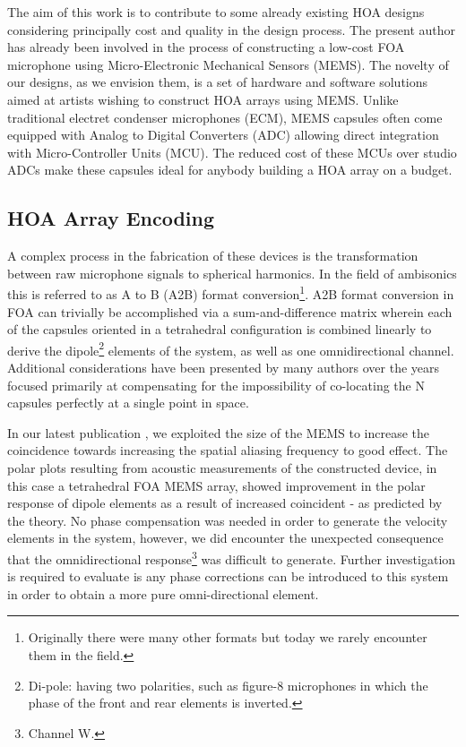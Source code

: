 The aim of this work is to contribute to some already existing HOA designs considering principally cost and quality in the design process. The present author has already been involved in the process of constructing a low-cost FOA microphone using Micro-Electronic Mechanical Sensors (MEMS). The novelty of our designs, as we envision them, is a set of hardware and software solutions aimed at artists wishing to construct HOA arrays using MEMS. Unlike traditional electret condenser microphones (ECM), MEMS capsules often come equipped with Analog to Digital Converters (ADC) allowing direct integration with Micro-Controller Units (MCU). The reduced cost of these MCUs over studio ADCs make these capsules ideal for anybody building a HOA array on a budget. 

\subsection{HOA Array Encoding}

A complex process in the fabrication of these devices is the transformation between raw microphone signals to spherical harmonics. In the field of ambisonics this is referred to as A to B (A2B) format conversion\footnote{Originally there were many other formats but today we rarely encounter them in the field.}. A2B format conversion in FOA can trivially be accomplished via a sum-and-difference matrix wherein each of the capsules oriented in a tetrahedral configuration is combined linearly to derive the dipole\footnote{Di-pole: having two polarities, such as figure-8 microphones in which the phase of the front and rear elements is inverted.} elements of the system, as well as one omnidirectional channel. Additional considerations have been presented by many authors over the years focused primarily at compensating for the impossibility of co-locating the N capsules perfectly at a single point in space.

In our latest publication \cite{zalles2019effects}, we exploited the size of the MEMS to increase the coincidence towards increasing the spatial aliasing frequency to good effect. The polar plots resulting from acoustic measurements of the constructed device, in this case a tetrahedral FOA MEMS array, showed improvement in the polar response of dipole elements as a result of increased coincident - as predicted by the theory. No phase compensation was needed in order to generate the velocity elements in the system, however, we did encounter the unexpected consequence that the omnidirectional response\footnote{Channel W.} was difficult to generate. Further investigation is required to evaluate is any phase corrections can be introduced to this system in order to obtain a more pure omni-directional element.

